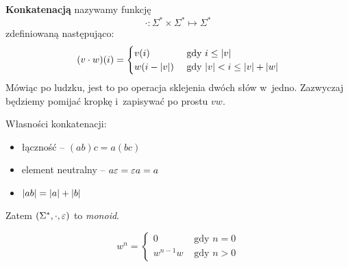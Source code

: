 \begin{definition}
	\textbf{Konkatenacją} nazywamy funkcję
	\begin{equation*}
		{\cdot}\colon \Sigma^* \times \Sigma^* \mapsto \Sigma^*
	\end{equation*}
	zdefiniowaną następująco:
	\begin{equation*}
		\pars{v \cdot w}\pars{i} = \begin{cases}
			v\pars{i}           & \text{ gdy } i \leq \len{v}                     \\
			w\pars{i - \len{v}} & \text{ gdy } \len{v} < i \leq \len{v} + \len{w}
		\end{cases}
	\end{equation*}
	Mówiąc po ludzku, jest to po operacja sklejenia dwóch słów w~jedno.
	Zazwyczaj będziemy pomijać kropkę i~zapisywać po prostu \(vw\).
\end{definition}
Własności konkatenacji:
\begin{itemize}
	\item łączność -- \( (ab)c = a(bc) \)
	\item element neutralny -- \( a\varepsilon = \varepsilon a = a \)
	\item \(\len{ab} = \len{a} + \len{b}\)
\end{itemize}
Zatem \( (\Sigma ^*, \cdot , \varepsilon) \) to \emph{monoid}.
\begin{definition}
	\[
		w^n = \begin{cases}
			0        & \text{ gdy } n = 0 \\
			w^{n-1}w & \text{ gdy } n > 0
		\end{cases}
	\]
\end{definition}

